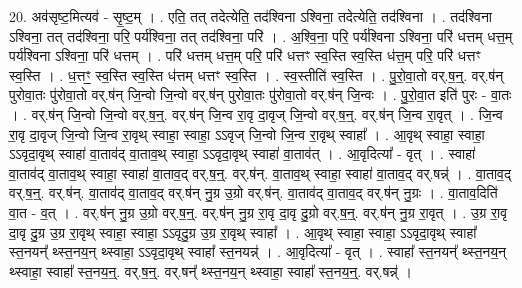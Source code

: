 \documentclass[17pt]{extarticle}
\begin{document}
20. अव॑सृष्ट॒मित्यव॑ - सृ॒ष्ट॒म् । . एति॒ तत् तदेत्येति॒ तद॑श्विना ऽश्विना॒ तदेत्येति॒ तद॑श्विना । . तद॑श्विना ऽश्विना॒ तत् तद॑श्विना॒ परि॒ पर्य॑श्विना॒ तत् तद॑श्विना॒ परि॑ । . अ॒श्वि॒ना॒ परि॒ पर्य॑श्विना ऽश्विना॒ परि॑ धत्तम् धत्त॒म् पर्य॑श्विना ऽश्विना॒ परि॑ धत्तम् । . परि॑ धत्तम् धत्त॒म् परि॒ परि॑ धत्तꣳ स्व॒स्ति स्व॒स्ति ध॑त्त॒म् परि॒ परि॑ धत्तꣳ स्व॒स्ति । . ध॒त्तꣳ॒॒ स्व॒स्ति स्व॒स्ति ध॑त्तम् धत्तꣳ स्व॒स्ति । . स्व॒स्तीति॑ स्व॒स्ति । . पु॒रो॒वा॒तो वर्.ष॒न्॒. वर्.ष॑न् पुरोवा॒तः पु॑रोवा॒तो वर्.ष॑न् जि॒न्वो जि॒न्वो वर्.ष॑न् पुरोवा॒तः पु॑रोवा॒तो वर्.ष॑न् जि॒न्वः । . पु॒रो॒वा॒त इति॑ पुरः - वा॒तः । . वर्.ष॑न् जि॒न्वो जि॒न्वो वर्.ष॒न्॒. वर्.ष॑न् जि॒न्व रा॒वृ दा॒वृज् जि॒न्वो वर्.ष॒न्॒. वर्.ष॑न् जि॒न्व रा॒वृत् । . जि॒न्व रा॒वृ दा॒वृज् जि॒न्वो जि॒न्व रा॒वृथ् स्वाहा॒ स्वाहा॒ ऽऽवृज् जि॒न्वो जि॒न्व रा॒वृथ् स्वाहा᳚ । . आ॒वृथ् स्वाहा॒ स्वाहा॒ ऽऽवृदा॒वृथ् स्वाहा॑ वा॒ताव॑द् वा॒ताव॒थ् स्वाहा॒ ऽऽवृदा॒वृथ् स्वाहा॑ वा॒ताव॑त् । . आ॒वृदित्या᳚ - वृत् । . स्वाहा॑ वा॒ताव॑द् वा॒ताव॒थ् स्वाहा॒ स्वाहा॑ वा॒ताव॒द् वर्.ष॒न्॒. वर्.ष॑न्. वा॒ताव॒थ् स्वाहा॒ स्वाहा॑ वा॒ताव॒द् वर्.षन्न्॑ । . वा॒ताव॒द् वर्.ष॒न्॒. वर्.ष॑न्. वा॒ताव॑द् वा॒ताव॒द् वर्.ष॑न् नु॒ग्र उ॒ग्रो वर्.ष॑न्. वा॒ताव॑द् वा॒ताव॒द् 
वर्.ष॑न् नु॒ग्रः । . वा॒ताव॒दिति॑ वा॒त - व॒त् । . वर्.ष॑न् नु॒ग्र उ॒ग्रो वर्.ष॒न्॒. वर्.ष॑न् नु॒ग्र रा॒वृ दा॒वृ दु॒ग्रो वर्.ष॒न्॒. वर्.ष॑न् नु॒ग्र रा॒वृत् । . उ॒ग्र रा॒वृ दा॒वृ दु॒ग्र उ॒ग्र रा॒वृथ् स्वाहा॒ स्वाहा॒ ऽऽवृदु॒ग्र उ॒ग्र रा॒वृथ् स्वाहा᳚ । . आ॒वृथ् स्वाहा॒ स्वाहा॒ ऽऽवृदा॒वृथ् स्वाहा᳚ स्त॒नयन्᳚ थ्स्त॒नय॒न् थ्स्वाहा॒ ऽऽवृदा॒वृथ् स्वाहा᳚ स्त॒नयन्न्॑ । . आ॒वृदित्या᳚ - वृत् । . स्वाहा᳚ स्त॒नयन्᳚ थ्स्त॒नय॒न् थ्स्वाहा॒ स्वाहा᳚ स्त॒नय॒न्॒. वर्.ष॒न्॒. वर्.षन्᳚ थ्स्त॒नय॒न् थ्स्वाहा॒ स्वाहा᳚ स्त॒नय॒न्॒. वर्.षन्न्॑ । \newline
\end{document}
